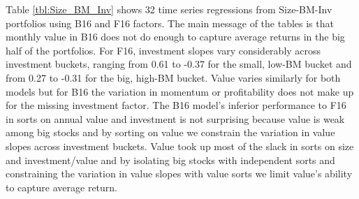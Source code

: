
Table \ref{tbl:Size_BM_Inv} shows 32 time series regressions from Size-BM-Inv
portfolios using B16 and F16 factors.
The main message of the tables is that monthly value in B16 does not do enough
to capture average returns in the big half of the portfolios.
For F16, investment slopes vary considerably across investment buckets, ranging
from 0.61 to -0.37 for the small, low-BM bucket and from 0.27 to -0.31 for the
big, high-BM bucket.
Value varies similarly for both models but for B16 the variation in momentum or
profitability does not make up for the missing investment factor.
The B16 model's inferior performance to F16 in sorts on annual value and
investment is not surprising because value is weak among big stocks and by
sorting on value we constrain the variation in value slopes across investment
buckets.
Value took up most of the slack in sorts on size and investment/value and by
isolating big stocks with independent sorts and constraining the variation in
value slopes with value sorts we limit value's ability to capture average
return.

